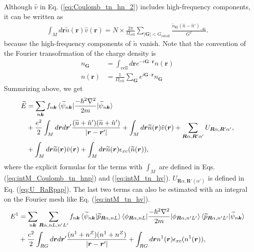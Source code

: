 \documentclass{article}
\begin{document}
Although $\hat{v}$ in Eq. (\ref{eq:Coulomb_tn_hn_2}) includes high-frequency components, it can be written as
\begin{align}
  \int_M d\bm{r} \widetilde{n} (\bm{r}) \hat{v}(\bm{r}) 
  =
  N\times \frac{2\pi}{\Omega_{\text{cell}}} \sum_{|\bm{G}| < G_{\text{cutoff}} } \frac{\widetilde{n}_{\bm{G}}(\hat{n} - \hat{n}')_{-\bm{G}}}{G^2}.
  \label{eq:intM_tn_hv}
\end{align}
because the high-frequency components of $\widetilde{n}$ vanish.
Note that the convention of the Fourier transofrmation of the charge density is
\begin{align}
  n_{\bm{G}} &= \int_{\text{cell}}d \bm{r} e^{-i\bm{G}\cdot \bm{r}} n(\bm{r})
  \\
  n(\bm{r}) &= \frac{1}{\Omega_{\text{cell}}} \sum_{\bm{G}} e^{i\bm{G}\cdot \bm{r}} n_{\bm{G}} 
\end{align}
Summrizing above, we get
\begin{align} 
  \widetilde{E} &= 
  \sum_{n\bm{k}} f_{n\bm{k}} \braket{\widetilde{\psi}_{n\bm{k}} | \frac{-\hbar^2\nabla^2}{2m} |\widetilde{\psi}_{n\bm{k}} }
  \nonumber
  \\&
  + \frac{e^2}{2}\int_M d\bm{r}d\bm{r}' \frac{(\widetilde{n} + \hat{n}')(\widetilde{n} + \hat{n}')}{|\bm{r}-\bm{r}'|}
  + \int_M d\bm{r} \widetilde{n} (\bm{r}) \hat{v}(\bm{r}) 
  + \sum_{\bm{R}\alpha, \bm{R}'\alpha'} U_{\bm{R}\alpha,\bm{R}'\alpha'},
  \nonumber
  \\&
  + \int_M d\bm{r} \widetilde{n}(\bm{r})\bar{v}(\bm{r})
  + \int_M d\bm{r} \widetilde{n}(\bm{r})\epsilon_{xc}(\widetilde{n}(\bm{r})),
  \label{eq:tildeE_numerical_calculation}
\end{align}
where the explicit formulas for the terms with $\int_M$ are defined in Eqs. (\ref{eq:intM_Coulomb_tn_hnp}) and (\ref{eq:intM_tn_hv}). $U_{\bm{R}\alpha,\bm{R}'(\alpha')}$ is defined in Eq. (\ref{eq:U_RaRpap}).
The last two terms can also be estimated with an integral on the Fourier mesh like Eq. (\ref{eq:intM_tn_hv}).
\begin{align} 
  {E}^1 &= 
  \sum_{n\bm{k}} \sum_{\bm{R}\alpha, nL, n'L'}f_{n\bm{k}} 
  \braket{\widetilde{\psi}_{n\bm{k}} | \widetilde{p}_{\bm{R}\alpha, nL}}
  \braket{\phi_{\bm{R}\alpha, nL}| \frac{-\hbar^2\nabla^2}{2m} |\phi_{\bm{R}\alpha, n'L'}}
  \braket{\widetilde{p}_{\bm{R}\alpha, n'L'}|\widetilde{\psi}_{n\bm{k}} }
  \nonumber\\&
  + \frac{e^2}{2}\int_{RG} d\bm{r}d\bm{r}' \frac{({n}^1 + n^Z)({n}^1 + n^Z)}{|\bm{r}-\bm{r}'|}
  + \int_{RG} d\bm{r} {n}^1(\bm{r})\epsilon_{xc}({n}^1(\bm{r})),
\end{align}
\end{document}
